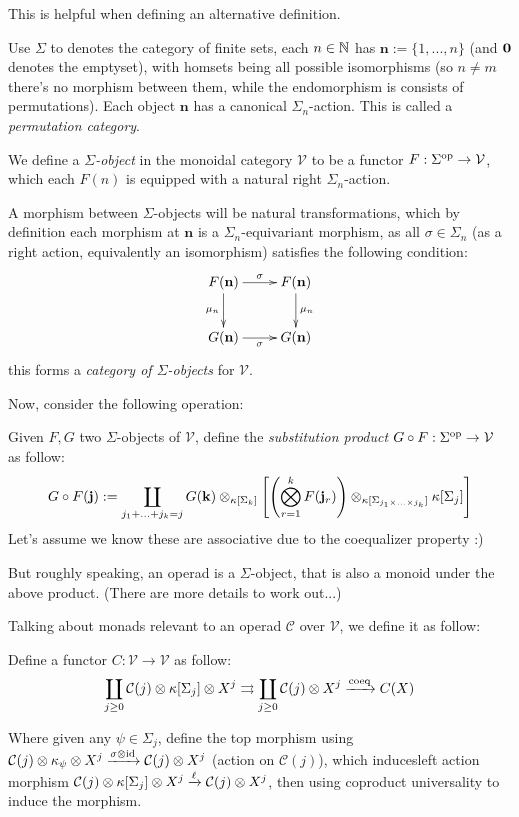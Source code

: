 \documentclass{article}
\begin{document}
This is helpful when defining an alternative definition.

Use $\Sigma$ to denotes the category of finite sets, each $n\in\mathbb{N}$ has $\mathbf{n}:=\{1,...,n\}$ (and $\mathbf{0}$ denotes the emptyset), with homsets being all possible isomorphisms (so $n\neq m$ there's no morphism between them, while the endomorphism is consists of permutations). Each object $\mathbf{n}$ has a canonical $\Sigma_n$-action. This is called a \emph{permutation category}.

\hfil

\begin{defn}
    We define a \emph{$\Sigma$-object} in the monoidal category $\mathcal{V}$ to be a functor $F:\Sigma^{\mathrm{op}}\rightarrow \mathcal{V}$, which each $F(n)$ is equipped with a natural right $\Sigma_n$-action.

    A morphism between $\Sigma$-objects will be natural transformations, which by definition each morphism at $\mathbf{n}$ is a $\Sigma_n$-equivariant morphism, as all $\sigma\in\Sigma_n$ (as a right action, equivalently an isomorphism) satisfies the following condition:
    \[\xymatrix{
        F(\mathbf{n}) \ar[d]_-{\mu_n} \ar[r]^-{\sigma} & F(\mathbf{n}) \ar[d]^-{\mu_n}\\
        G(\mathbf{n}) \ar[r]_-{\sigma} & G(\mathbf{n})
    }\]
    this forms a \emph{category of $\Sigma$-objects} for $\mathcal{V}$.
\end{defn}
Now, consider the following operation:
\begin{defn}
    Given $F,G$ two $\Sigma$-objects of $\mathcal{V}$, define the \emph{substitution product} $G\circ F:\Sigma^{\mathrm{op}}\rightarrow\mathcal{V}$ as follow:
    \[G\circ F(\mathbf{j}):=\coprod_{j_1+...+j_k=j}G(\mathbf{k})\otimes_{\kappa[\Sigma_k]}\left[\left(\bigotimes_{r=1}^k F(\mathbf{j}_r)\right)\otimes_{\kappa[\Sigma_{j_1\times...\times j_k}]}\kappa[\Sigma_j]\right]\]
    Let's assume we know these are associative due to the coequalizer property :)
\end{defn}
But roughly speaking, an operad is a $\Sigma$-object, that is also a monoid under the above product. (There are more details to work out...)

\hfil

Talking about monads relevant to an operad $\mathcal{C}$ over $\mathcal{V}$, we define it as follow:
\begin{defn}
    Define a functor $C:\mathcal{V}\rightarrow\mathcal{V}$ as follow:
    \[\coprod_{j\geq 0} \mathcal{C}(j)\otimes\kappa[\Sigma_j]\otimes X^j \rightrightarrows\coprod_{j\geq 0}\mathcal{C}(j)\otimes X^j \xrightarrow{\text{coeq}}C(X)\]
\end{defn}
Where given any $\psi\in \Sigma_j$, define the top morphism using $\mathcal{C}(j)\otimes \kappa_\psi\otimes X^j\xrightarrow{\sigma\otimes \mathrm{id}}\mathcal{C}(j)\otimes X^j$ (action on $\mathcal{C}(j)$), which inducesleft action morphism $\mathcal{C}(j)\otimes\kappa[\Sigma_j]\otimes X^j\xrightarrow{\ell}\mathcal{C}(j)\otimes X^j$, then using coproduct universality to induce the morphism.
\end{document}
